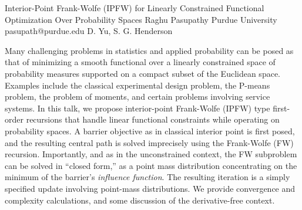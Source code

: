 \begin{talk}
  {Interior-Point Frank-Wolfe (IPFW) for Linearly Constrained Functional Optimization Over Probability Spaces}%
  {Raghu Pasupathy}%
  {Purdue University}%
  {pasupath@purdue.edu}%
  {D. Yu, S. G. Henderson}%
  
    
   
Many challenging problems in statistics and applied probability can be posed as that of minimizing a smooth functional over a linearly constrained space of probability measures supported on a compact subset of the Euclidean space. Examples include the classical experimental design problem, the P-means problem, the problem of moments, and certain problems involving service systems.  In this talk, we propose interior-point Frank-Wolfe (IPFW) type first-order recursions that handle linear functional constraints while operating on probability spaces. A barrier objective as in classical interior point is first posed, and the resulting central path is solved imprecisely using the Frank-Wolfe (FW) recursion. Importantly, and as in the unconstrained context, the FW subproblem can be solved in ``closed form,'' as a point mass distribution concentrating on the minimum of the barrier's \emph{influence function}. The resulting iteration is a simply specified update involving point-mass distributions. We provide convergence and complexity calculations, and some discussion of the derivative-free context. 

\medskip




\end{talk}
